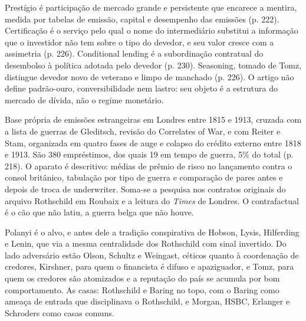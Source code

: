 

Prestígio é participação de mercado grande e persistente que encarece a
mentira, medida por tabelas de emissão, capital e desempenho das emissões (p.
222). Certificação é o serviço pelo qual o nome do intermediário substitui a
informação que o investidor não tem sobre o tipo do devedor, e seu valor
cresce com a assimetria (p. 226). Conditional lending é a subordinação
contratual do desembolso à política adotada pelo devedor (p. 230). Seasoning,
tomado de Tomz, distingue devedor novo de veterano e limpo de manchado (p.
226). O artigo não define padrão-ouro, conversibilidade nem lastro: seu objeto
é a estrutura do mercado de dívida, não o regime monetário.


Base própria de emissões estrangeiras em Londres entre 1815 e 1913, cruzada
com a lista de guerras de Gleditsch, revisão do Correlates of War, e com
Reiter e Stam, organizada em quatro fases de auge e colapso do crédito externo
entre 1818 e 1913. São 380 empréstimos, dos quais 19 em tempo de guerra, 5\%
do total (p. 218). O aparato é descritivo: médias de prêmio de risco no
lançamento contra o consol britânico, tabulação por tipo de guerra e
comparação de pares antes e depois de troca de underwriter. Soma-se a
pesquisa nos contratos originais do arquivo Rothschild em Roubaix e a leitura
do \textit{Times} de Londres. O contrafactual é o cão que não latiu, a guerra
belga que não houve.


Polanyi é o alvo, e antes dele a tradição conspirativa de Hobson, Lysis,
Hilferding e Lenin, que via a mesma centralidade dos Rothschild com sinal
invertido. Do lado adversário estão Olson, Schultz e Weingast, céticos quanto
à coordenação de credores, Kirshner, para quem o financista é difuso e
apaziguador, e Tomz, para quem os credores são atomizados e a reputação do
país se acumula por bom comportamento. As casas: Rothschild e Baring no topo,
com o Baring como ameaça de entrada que disciplinava o Rothschild, e Morgan,
HSBC, Erlanger e Schroders como casas comuns.


